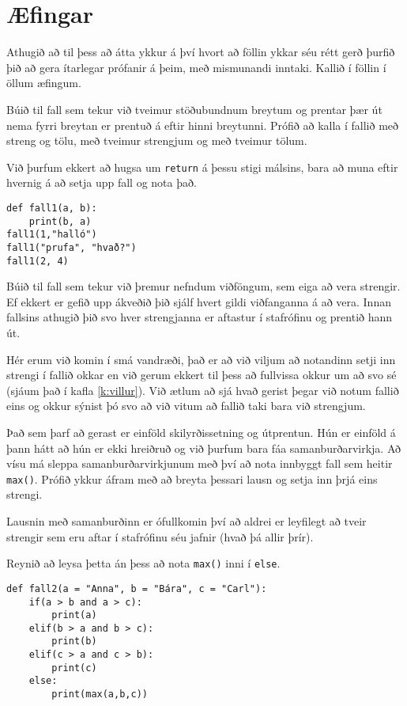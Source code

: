 \newpage
\section{Æfingar}
Athugið að til þess að átta ykkur á því hvort að föllin ykkar séu rétt gerð þurfið þið að gera ítarlegar prófanir á þeim, með mismunandi inntaki.
Kallið í föllin í öllum æfingum.

\begin{exercise}\label{fun1}
Búið til fall sem tekur við tveimur stöðubundnum breytum og prentar þær út nema fyrri breytan er prentuð á eftir hinni breytunni.
Prófið að kalla í fallið með streng og tölu, með tveimur strengjum og með tveimur tölum.
\end{exercise}
\begin{Answer}[ref={fun1}]
Við þurfum ekkert að hugsa um \texttt{return} á þessu stigi málsins, bara að muna eftir hvernig á að setja upp fall og nota það.
	\begin{lstlisting}
def fall1(a, b):
	print(b, a)
fall1(1,"halló")
fall1("prufa", "hvað?")	
fall1(2, 4)\end{lstlisting}
\end{Answer}


\begin{exercise}\label{fun2}
Búið til fall sem tekur við þremur nefndum viðföngum, sem eiga að vera strengir.
Ef ekkert er gefið upp ákveðið þið sjálf hvert gildi viðfanganna á að vera.
Innan fallsins athugið þið svo hver strengjanna er aftastur í stafrófinu og prentið hann út.
\end{exercise}
\begin{Answer}[ref={fun2}]
Hér erum við komin í smá vandræði, það er að við viljum að notandinn setji inn strengi í fallið okkar en við gerum ekkert til þess að fullvissa okkur um að svo sé (sjáum það í kafla \ref{k:villur}).
Við ætlum að sjá hvað gerist þegar við notum fallið eins og okkur sýnist þó svo að við vitum að fallið taki bara við strengjum.

Það sem þarf að gerast er einföld skilyrðissetning og útprentun.
Hún er einföld á þann hátt að hún er ekki hreiðruð og við þurfum bara fáa samanburðarvirkja.
Að vísu má sleppa samanburðarvirkjunum með því að nota innbyggt fall sem heitir \texttt{max()}.
Prófið ykkur áfram með að breyta þessari lausn og setja inn þrjá eins strengi.

Lausnin með samanburðinn er ófullkomin því að aldrei er leyfilegt að tveir strengir sem eru aftar í stafrófinu séu jafnir (hvað þá allir þrír).

Reynið að leysa þetta án þess að nota \texttt{max()} inni í \texttt{else}.
\begin{lstlisting}
def fall2(a = "Anna", b = "Bára", c = "Carl"):
	if(a > b and a > c):
		print(a)
	elif(b > a and b > c):
		print(b)
	elif(c > a and c > b):
		print(c)
	else:
		print(max(a,b,c))\end{lstlisting}
\end{Answer}

